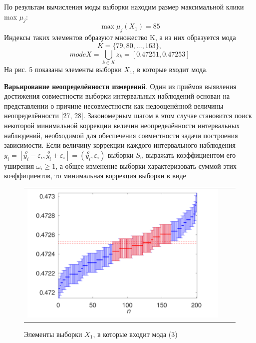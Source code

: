 \documentclass[a4paper,14pt]{article}
\begin{document}
	По результам вычисления моды выборки находим размер максимальной клики
	max $\mu_j$:
	\begin{equation}
		\max \mu_j (X_1) = 85
	\end{equation}
	Индексы таких элементов образуют множество K, а из них образуется мода
	\begin{equation}
		K = \{79, 80, ..., 163\},
	\end{equation}
	\begin{equation}
		mode X = \bigcup_{k \in K} z_k = [0.47251, 0.47253]
	\end{equation}
	На рис. 5 показаны элементы выборки $X_1$, в которые входит мода.
	
	\textbf{Варьирование неопределённости измерений}. Один из приёмов выявления достижения совместности выборки интервальных наблюдений основан на представлении о причине несовместности как недооценённой величины неопределённости [27, 28]. Закономерным шагом в этом случае становится поиск некоторой минимальной коррекции величин неопределённости интервальных наблюдений, необходимой для обеспечения совместности задачи построения зависимости. Если величину коррекции каждого интервального наблюдения $y_i = [\stackrel{o}{y_i} - \varepsilon_i, \stackrel{o}{y_i} + \varepsilon_i] = (\stackrel{o}{y_i}, \varepsilon_i)$ выборки $S_n$ выражать коэффициентом его уширения $\omega_i \geq 1$, а общее изменение выборки характеризовать суммой этих коэффициентов, то минимальная коррекция выборки в виде
	\begin{figure}[H]
		\begin{center}
			\begin{tabular}{ccc}
				\includegraphics[scale=0.8]{../image/interval_theory.png}
			\end{tabular}
		\end{center}
		\caption{Элементы выборки $X_1$, в которые входит мода (3)} 
	\end{figure}
	
\end{document}
